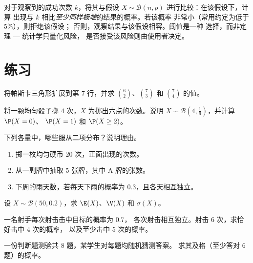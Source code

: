 \begin{method}[基于二项模型的判定准则]\label{met:g11:binom:decision}
对于观察到的成功次数 $k$，将其与假设
$X \sim \mathcal B(n, p)$ 进行比较：在该假设下，计算
出现与 $k$ 相比\emph{至少同样极端}的结果的概率。若该概率
非常小（常用约定为低于 $5\%$），则拒绝该假设；
否则，观察结果与该假设相容。阈值是一种
选择，而非定理 --- 统计学只量化风险，
是否接受该风险则由使用者决定。
\end{method}

\section{练习}

\begin{exercise}[$\star$]\label{exo:g11:binom:1}
将帕斯卡三角形扩展到第 $7$ 行，并求
$\binom62$、$\binom{7}{3}$ 和 $\binom74$ 的值。
\end{exercise}

\begin{exercise}[$\star$]\label{exo:g11:binom:2}
将一颗均匀骰子掷 $4$ 次，$X$ 为掷出六点的次数。说明
$X \sim \mathcal B\left(4, \frac16\right)$，并计算 $\P(X = 0)$、
$\P(X = 1)$ 和 $\P(X \geq 2)$。
\end{exercise}

\begin{exercise}[$\star$]\label{exo:g11:binom:3}
下列各量中，哪些服从二项分布？说明理由。
\begin{enumerate}
  \item 掷一枚均匀硬币 $20$ 次，正面出现的次数。
  \item 从一副牌中抽取 $5$ 张牌，其中 A 牌的张数。
  \item 下周的雨天数，若每天下雨的概率为
        $0.3$，且各天相互独立。
\end{enumerate}
\end{exercise}

\begin{exercise}[$\star$]\label{exo:g11:binom:4}
设 $X \sim \mathcal B(50, 0.2)$，求 $\E(X)$、$\V(X)$ 和 $\sigma(X)$。
\end{exercise}

\begin{exercise}[$\star\star$]\label{exo:g11:binom:5}
一名射手每次射击击中目标的概率为 $0.7$，
各次射击相互独立。射击 $6$ 次，求恰好击中 $4$ 次的概率，
以及至少击中 $5$ 次的概率。
\end{exercise}

\begin{exercise}[$\star\star$]\label{exo:g11:binom:6}
一份判断题测验共 $8$ 题，某学生对每题均随机猜测答案。
求其及格（至少答对 $6$ 题）的概率。
\end{exercise}

